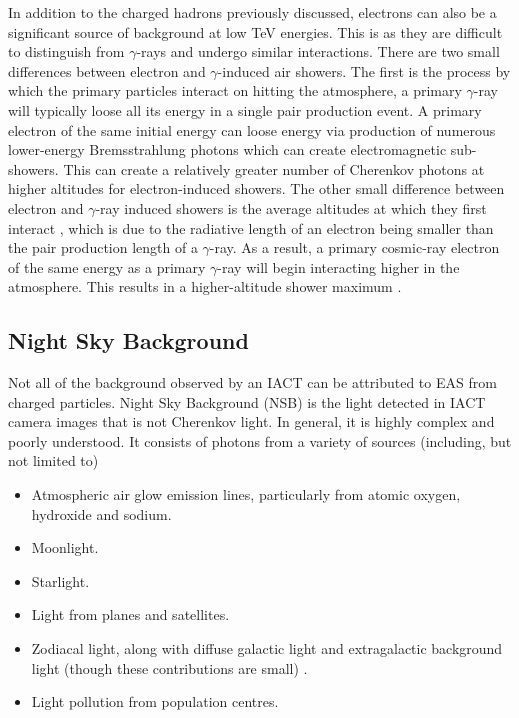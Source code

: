 In addition to the charged hadrons previously discussed, electrons can also be a significant source of background at low TeV energies. This is as they are difficult to distinguish from $\gamma$-rays and undergo similar interactions. There are two small differences between electron and $\gamma$-induced air showers. The first is the process by which the primary particles interact on hitting the atmosphere, a primary $\gamma$-ray will typically loose all its energy in a single pair production event. A primary electron of the same initial energy can loose energy via production of numerous lower-energy Bremsstrahlung photons which can create electromagnetic sub-showers. This can create a relatively greater number of Cherenkov photons at higher altitudes for electron-induced showers. The other small difference between electron and $\gamma$-ray induced showers is the average altitudes at which they first interact \cite{Sitarek1i}, which is due to the radiative length of an electron being smaller than the pair production length of a $\gamma$-ray. As a result, a primary cosmic-ray electron of the same energy as a primary $\gamma$-ray will begin interacting higher in the atmosphere. This results in a higher-altitude shower maximum \cite{lypova}. 

\subsection{Night Sky Background}
Not all of the background observed by an IACT can be attributed to EAS from charged particles. Night Sky Background (NSB) is the light detected in IACT camera images that is not Cherenkov light. In general, it is highly complex and poorly understood. It consists of photons from a variety of sources (including, but not limited to)

\begin{itemize}
    \item Atmospheric air glow emission lines, particularly from atomic oxygen, hydroxide and sodium.
    \item Moonlight.
    \item Starlight.
    \item Light from planes and satellites.
    \item Zodiacal light, along with diffuse galactic light and extragalactic background light (though these contributions are small) \cite{nsbref}.
    \item Light pollution from population centres.
\end{itemize}

